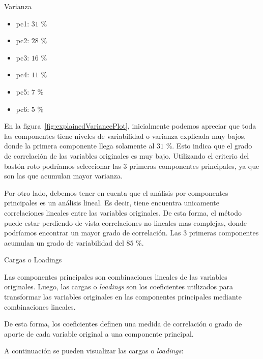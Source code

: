 \documentclass[11pt,a4paper,twoside]{thesis}
\begin{document}
\begin{description}
	\item[Varianza]
\end{description}
\begin{itemize}
	\item pc1: $31$ \%
	\item pc2: $28$ \%
	\item pc3: $16$ \%
	\item pc4: $11$ \%
	\item pc5: $7$ \%
	\item pc6: $5$ \%
\end{itemize}

En la figura~\ref{fig:explainedVariancePlot}, inicialmente podemos apreciar que
toda las componentes tiene niveles de variabilidad o varianza explicada muy
bajos, donde la primera componente llega solamente al $31$ \%. Esto indica que
el grado de correlación de las variables originales es muy bajo. Utilizando el
criterio del bastón roto podríamos seleccionar las 3 primeras componentes
principales, ya que son las que acumulan mayor varianza.

Por otro lado, debemos tener en cuenta que el análisis por componentes
principales es un análisis lineal. Es decir, tiene encuentra unicamente
correlaciones lineales entre las variables originales. De esta forma, el método
puede estar perdiendo de vista correlaciones no lineales mas complejas, donde
podríamos encontrar un mayor grado de correlación. Las 3 primeras componentes
acumulan un grado de variabilidad del $85$ \%.

\begin{description}
	\item[Cargas o Loadings]
\end{description}

Las componentes principales son combinaciones lineales de las variables
originales. Luego, las cargas o \textit{loadings} son los coeficientes
utilizados para transformar las variables originales en las componentes
principales mediante combinaciones lineales.

De esta forma, los coeficientes definen una medida de correlación o grado de
aporte de cada variable original a una componente principal.

A continuación se pueden visualizar las cargas o \textit{loadings}:
\end{document}
